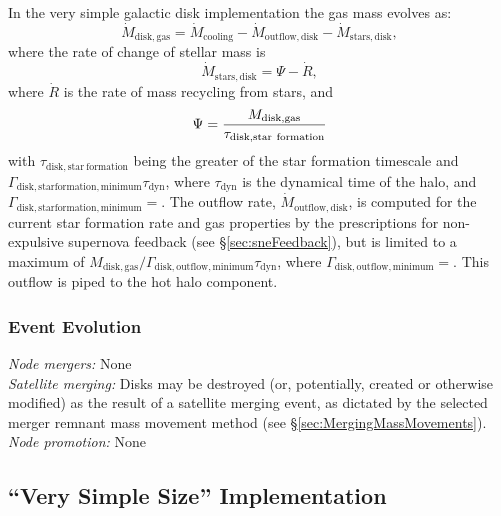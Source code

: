 In the very simple galactic disk implementation the gas mass evolves as:
\begin{equation}
 \dot{M}_\mathrm{disk, gas} = \dot{M}_\mathrm{cooling} - \dot{M}_\mathrm{outflow, disk} - \dot{M}_\mathrm{stars, disk},
\end{equation}
where the rate of change of stellar mass is
\begin{equation}
 \dot{M}_\mathrm{stars, disk} = \Psi - \dot{R},
\end{equation}
where $\dot{R}$ is the rate of mass recycling from stars, and
\begin{equation}
 \Psi = {M_\mathrm{disk, gas} \over \tau_\mathrm{disk, star~formation}}
\end{equation}
with $\tau_\mathrm{disk, star~formation}$ being the greater of the star formation timescale and $\Gamma_\mathrm{disk, star formation, minimum} \tau_\mathrm{dyn}$, where $\tau_\mathrm{dyn}$ is the dynamical time of the halo, and $\Gamma_\mathrm{disk, star formation, minimum}=${\normalfont \ttfamily [diskStarFormationTimescaleMinimum]}. The outflow rate, $\dot{M}_\mathrm{outflow, disk}$, is computed for the current star formation rate and gas properties by the prescriptions for non-expulsive supernova feedback (see \S\ref{sec:sneFeedback}), but is limited to a maximum of $M_\mathrm{disk, gas}/ \Gamma_\mathrm{disk, outflow, minimum} \tau_\mathrm{dyn}$, where $\Gamma_\mathrm{disk, outflow, minimum}=${\normalfont \ttfamily [diskOutflowTimescaleMinimum]}. This outflow is piped to the hot halo component.

\subsubsection{Event Evolution}

\noindent\emph{Node mergers:} None\\

\noindent\emph{Satellite merging:} Disks may be destroyed (or, potentially, created or otherwise modified) as the result of a satellite merging event, as dictated by the selected merger remnant mass movement method (see \S\ref{sec:MergingMassMovements}).\\

\noindent\emph{Node promotion:} None\\

\subsection{``Very Simple Size'' Implementation}

